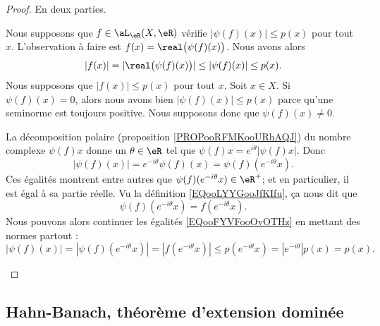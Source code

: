\begin{proof}
	En deux parties.
	\begin{subproof}
		\spitem[\( \Rightarrow\)]
		Nous supposons que \( f\in \aL_{\eR}(X,\eR)\) vérifie \( | \psi(f)(x) |\leq p(x)\) pour tout \( x\). L'observation à faire est \( f(x)=\real\big( \psi(f)(x) \big)\). Nous avons alors
		\begin{equation}
			| f(x) |=| \real\big( \psi(f)(x) \big) |\leq | \psi(f)(x) |\leq p(x).
		\end{equation}
		\spitem[\( \Leftarrow\)]
		Nous supposons que \( | f(x) |\leq p(x)\) pour tout \( x\). Soit \( x\in X\). Si \( \psi(f)(x)=0\), alors nous avons bien \( | \psi(f)(x) |\leq p(x)\) parce qu'une seminorme est toujours positive. Nous supposons donc que \( \psi(f)(x)\neq 0\).

		La décomposition polaire (proposition \ref{PROPooRFMKooURhAQJ}) du nombre complexe \( \psi(f)x\) donne un \( \theta\in \eR\) tel que \( \psi(f)x= e^{i\theta}| \psi(f)x |\). Donc
		\begin{equation}        \label{EQooFYVFooOvOTHz}
			| \psi(f)(x) |= e^{-i\theta}\psi(f)(x)=\psi(f)( e^{-i\theta}x).
		\end{equation}
		Ces égalités montrent entre autres que \( \psi(f)( e^{-i\theta}x)\in \eR^+\); et en particulier, il est égal à sa partie réelle. Vu la définition \eqref{EQooLYYGooJfKIfu}, ça nous dit que
		\begin{equation}
			\psi(f)( e^{-i\theta}x)=f( e^{-i\theta}x).
		\end{equation}
		Nous pouvons alors continuer les égalités \eqref{EQooFYVFooOvOTHz} en mettant des normes partout :
		\begin{equation}
			| \psi(f)(x) |=| \psi(f)( e^{-i\theta}x) |=| f( e^{-i\theta}x) |\leq p( e^{-i\theta}x)=|  e^{-i\theta} |p(x)=p(x).
		\end{equation}
	\end{subproof}
\end{proof}

\subsection{Hahn-Banach, théorème d'extension dominée}

